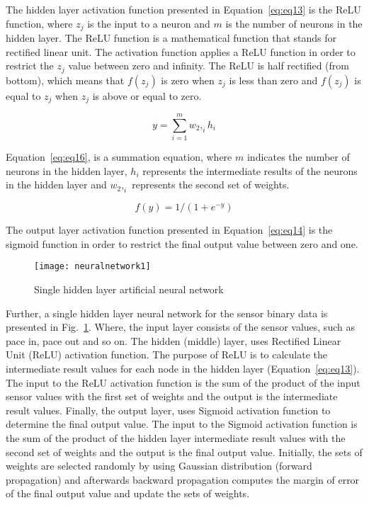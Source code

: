 \documentclass[runningheads]{llncs}
\begin{document}
The hidden layer activation function presented in Equation~\ref{eq:eq13} is the ReLU function, where $z_j$ is the input to a neuron and $m$ is the number of neurons in the hidden layer. The ReLU function is a mathematical function that stands for rectified linear unit. The activation function applies a ReLU function in order to restrict the $z_j$ value between zero and infinity. The ReLU is half rectified (from bottom), which means that $f(z_j)$ is zero when $z_j$ is less than zero and $f(z_j)$ is equal to $z_j$ when $z_j$ is above or equal to zero.

\begin{equation}
\label{eq:eq16}
y = \sum_{i=1}^{m} w_2,_ih_i
\end{equation}

Equation~\ref{eq:eq16}, is a summation equation, where $m$ indicates the number of neurons in the hidden layer, $h_i$ represents the intermediate results of the neurons in the hidden layer and $w_2,_i$ represents the second set of weights.

\begin{equation}
\label{eq:eq14}
f(y) = 1/(1 + e^{-y})
\end{equation}

The output layer activation function presented in Equation~\ref{eq:eq14} is the sigmoid function in order to restrict the final output value between zero and one.

\begin{figure}
\centering
\texttt{[image: neuralnetwork1]} 
\caption{Single hidden layer artificial neural network}
\label{fig:neuralnetwork}
\end{figure}

Further, a single hidden layer neural network for the sensor binary data is presented in Fig.~\ref{fig:neuralnetwork}. Where, the input layer consists of the sensor values, such as pace in, pace out and so on. The hidden (middle) layer, uses Rectified Linear Unit (ReLU) activation function. The purpose of  ReLU is to calculate the intermediate result values for each node in the hidden layer (Equation~\ref{eq:eq13}). The input to the ReLU activation function is the sum of the product of the input sensor values with the first set of weights and the output is the intermediate result values. Finally, the output layer, uses Sigmoid activation function to determine the final output value. The input to the Sigmoid activation function is the sum of the product of the hidden layer intermediate result values with the second set of weights and the output is the final output value. Initially, the sets of weights are selected randomly by using Gaussian distribution (forward propagation) and afterwards backward propagation computes the margin of error of the final output value and update the sets of weights. 
\end{document}
